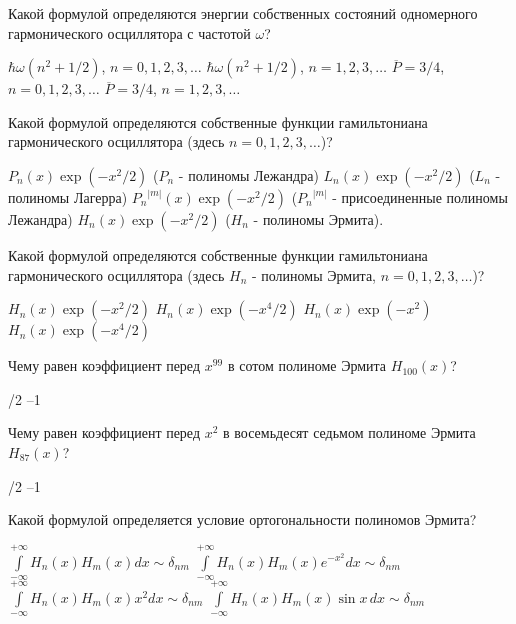 \documentclass[11pt,a4paper]{exam}
\begin{document}
\begin{questions}

\question Какой формулой определяются энергии собственных состояний одномерного гармонического осциллятора с частотой $\omega $?
\begin{choices}
\choice $\hbar \omega ({{n}^{2}}+1/2)$, $n=0,1,2,3,\ldots $      
\choice $\hbar \omega ({{n}^{2}}+1/2)$, $n=1,2,3,\ldots $
\choice $\overline{P}=3/4$, $n=0,1,2,3,\ldots $      
\choice $\overline{P}=3/4$, $n=1,2,3,\ldots $ 
\end{choices}

\question Какой формулой определяются собственные функции гамильтониана гармонического осциллятора (здесь $n=0,1,2,3,\ldots $)?
\begin{choices}
\choice ${{P}_{n}}(x)\exp \left( -{{x}^{2}}/2 \right)$ (${{P}_{n}}$ - полиномы Лежандра)
\choice ${{L}_{n}}(x)\exp \left( -{{x}^{2}}/2 \right)$ (${{L}_{n}}$ - полиномы Лагерра)
\choice ${{P}_{n}}^{\left| m \right|}(x)\exp \left( -{{x}^{2}}/2 \right)$ (${{P}_{n}}^{\left| m \right|}$ - присоединенные полиномы Лежандра)
\choice ${{H}_{n}}(x)\exp \left( -{{x}^{2}}/2 \right)$ (${{H}_{n}}$ - полиномы Эрмита).
\end{choices}

\question Какой формулой определяются собственные функции гамильтониана гармонического осциллятора (здесь ${{H}_{n}}$ - полиномы Эрмита, $n=0,1,2,3,\ldots $)?
\begin{choices}
\choice ${{H}_{n}}(x)\exp \left( -{{x}^{2}}/2 \right)$  
\choice ${{H}_{n}}(x)\exp \left( -{{x}^{4}}/2 \right)$
\choice ${{H}_{n}}(x)\exp \left( -{{x}^{2}} \right)$    
\choice ${{H}_{n}}(x)\exp \left( -{{x}^{4}}/2 \right)$ 
\end{choices}

\question Чему равен коэффициент перед ${{x}^{99}}$ в сотом полиноме Эрмита ${{H}_{100}}(x)$?
\begin{choices}
/2     
\choice –1
\end{choices}

\question Чему равен коэффициент перед ${{x}^{2}}$ в восемьдесят седьмом полиноме Эрмита ${{H}_{87}}(x)$?
\begin{choices}
/2     
\choice –1
\end{choices}

\question Какой формулой определяется условие ортогональности полиномов Эрмита?
\begin{choices}
\choice $\int\limits_{-\infty }^{+\infty }{{{H}_{n}}(x){{H}_{m}}(x)dx\sim {{\delta }_{nm}}}$      
\choice $\int\limits_{-\infty }^{+\infty }{{{H}_{n}}(x){{H}_{m}}(x){{e}^{-{{x}^{2}}}}dx\sim {{\delta }_{nm}}}$
\choice $\int\limits_{-\infty }^{+\infty }{{{H}_{n}}(x){{H}_{m}}(x){{x}^{2}}dx\sim {{\delta }_{nm}}}$      
\choice $\int\limits_{-\infty }^{+\infty }{{{H}_{n}}(x){{H}_{m}}(x)\sin x\,dx\sim {{\delta }_{nm}}}$
\end{choices}


\end{questions}
\end{document}

